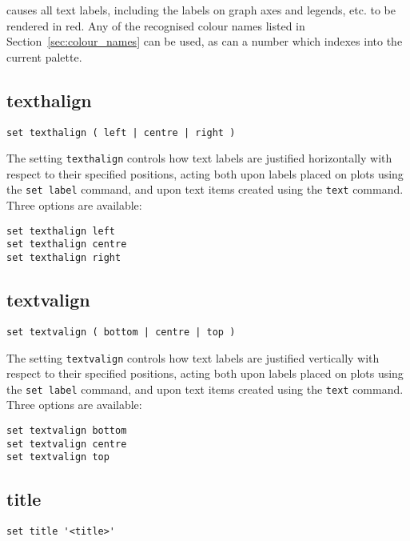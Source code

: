 \noindent causes all text labels, including the labels on graph axes and
legends, etc. to be rendered in red. Any of the recognised colour names listed
in Section~\ref{sec:colour_names} can be used, as can a number which indexes
into the current palette.


\subsection{texthalign}

\begin{verbatim}
set texthalign ( left | centre | right )
\end{verbatim}

The setting {\tt texthalign} controls how text labels are justified
horizontally with respect to their specified positions, acting both upon labels
placed on plots using the {\tt set label} command, and upon text items created
using the {\tt text} command. Three options are available:

\begin{verbatim}
set texthalign left
set texthalign centre
set texthalign right
\end{verbatim}


\subsection{textvalign}

\begin{verbatim}
set textvalign ( bottom | centre | top )
\end{verbatim}

The setting {\tt textvalign} controls how text labels are justified vertically
with respect to their specified positions, acting both upon labels placed on
plots using the {\tt set label} command, and upon text items created using the
{\tt text} command. Three options are available:

\begin{verbatim}
set textvalign bottom
set textvalign centre
set textvalign top
\end{verbatim}


\subsection{title}

\begin{verbatim}
set title '<title>'
\end{verbatim}

